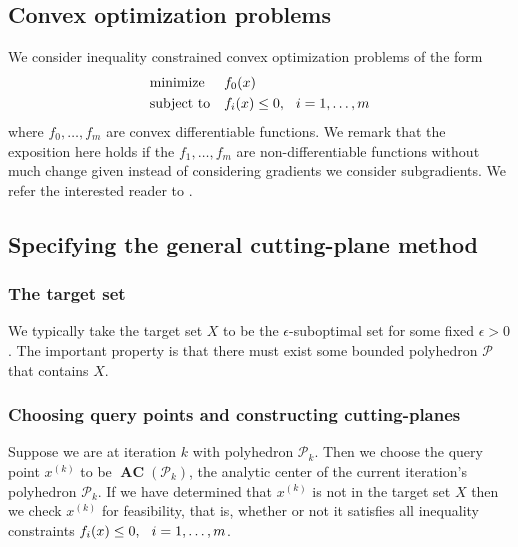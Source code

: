 \documentclass[11pt]{amsart}
\theoremstyle{definition}
\theoremstyle{remark}
\newcommand{\gap}{\hspace*{0.25cm}}
\DeclareMathOperator{\AC}{\textbf{AC}}
\begin{document}
    \subsection{Convex optimization problems}
        We consider inequality constrained convex optimization problems of the form 
        \begin{equation}\label{e:cvx_opt_problem}
            \begin{aligned}
            & {\text{minimize}} && f_0(x) \\
            & \text{subject to} && f_i(x) \leq 0, \gap i = 1, \dots, m
            \end{aligned}
        \end{equation}
        where $f_0, \dots, f_m$ are convex differentiable functions. We remark that the exposition here holds if the $f_1, \dots, f_m$ are non-differentiable functions without much change given instead of considering gradients we consider subgradients. We refer the interested reader to \cite{BDV15}. 

    \subsection{Specifying the general cutting-plane method}\label{ss:accpm_cp}
        \subsubsection{The target set} We typically take the target set $X$ to be the $\epsilon$-suboptimal set for some fixed $\epsilon > 0$. The important property is that there must exist some bounded polyhedron $\mathcal{P}$ that contains $X$.

        \subsubsection{Choosing query points and constructing cutting-planes} Suppose we are at iteration $k$ with polyhedron $\mathcal{P}_k$. Then we choose the query point $x^{(k)}$ to be $\AC(\mathcal{P}_k)$, the analytic center of the current iteration's polyhedron $\mathcal{P}_k$. If we have determined that $x^{(k)}$ is not in the target set $X$ then we check $x^{(k)}$ for feasibility, that is, whether or not it satisfies all inequality constraints $f_i(x) \leq 0, \gap i = 1, \dots, m$. 
\end{document}
